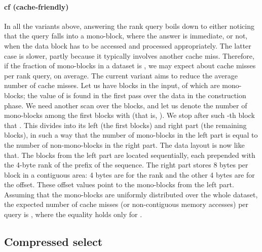 \documentclass{llncs}
\begin{document}
\paragraph*{\textbf{cf (cache-friendly)}}
In all the variants above, answering the rank query boils down to 
either noticing that the query falls into a mono-block, where the answer 
is immediate, or not, when the data block has to be accessed and processed 
appropriately.
The latter case is slower, partly because it typically involves another 
cache miss.
Therefore, if the fraction of mono-blocks in a dataset is , 
we may expect about  cache misses per rank query, on average.
The current variant aims to reduce the average number of cache misses.
Let us have  blocks in the input,  of which are mono-blocks; 
the value of  is found in the first pass over the data 
in the construction phase.
We need another scan over the blocks, and let us denote the 
number of mono-blocks among the first  blocks with  
(that is, ).
We stop after such -th block that 
.
This divides  into its left (the first  blocks) 
and right part (the remaining  blocks), 
in such a way that the number of mono-blocks in the left part 
is equal 
to the number of non-mono-blocks in the right part.
The data layout is now like that.
The blocks from the left part are located sequentially, 
each prepended with the 4-byte rank of the prefix of the sequence.
The right part stores 8 bytes per block in a contiguous area: 
4 bytes are for the rank and the other 4 bytes are for the offset. 
These offset values point to the mono-blocks from the left part.
Assuming that the mono-blocks are uniformly distributed over the whole 
dataset, the expected number of cache misses 
(or non-contiguous memory accesses) per query is 
, 
where the equality holds only for .


\subsection{Compressed select}
\label{sec:csel}
\end{document}
